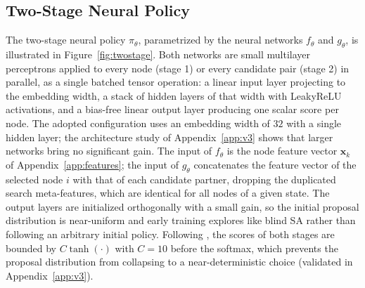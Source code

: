 \documentclass[letterpaper]{article} %
\begin{document}
\subsection{Two-Stage Neural Policy}
\label{app:policy}

The two-stage neural policy $\pi_\theta$, parametrized by the neural networks $f_\theta$ and $g_\theta$, is illustrated in Figure~\ref{fig:twostage}. Both networks are small multilayer perceptrons applied to every node (stage 1) or every candidate pair (stage 2) in parallel, as a single batched tensor operation: a linear input layer projecting to the embedding width, a stack of hidden layers of that width with LeakyReLU activations, and a bias-free linear output layer producing one scalar score per node. The adopted configuration uses an embedding width of $32$ with a single hidden layer; the architecture study of Appendix~\ref{app:v3} shows that larger networks bring no significant gain. The input of $f_\theta$ is the node feature vector $\mathbf{x}_k$ of Appendix~\ref{app:features}; the input of $g_\theta$ concatenates the feature vector of the selected node $i$ with that of each candidate partner, dropping the duplicated search meta-features, which are identical for all nodes of a given state. The output layers are initialized orthogonally with a small gain, so the initial proposal distribution is near-uniform and early training explores like blind SA rather than following an arbitrary initial policy. Following \citet{kool_attention_2019}, the scores of both stages are bounded by $C \tanh(\cdot)$ with $C = 10$ before the softmax, which prevents the proposal distribution from collapsing to a near-deterministic choice (validated in Appendix~\ref{app:v3}).
\end{document}
